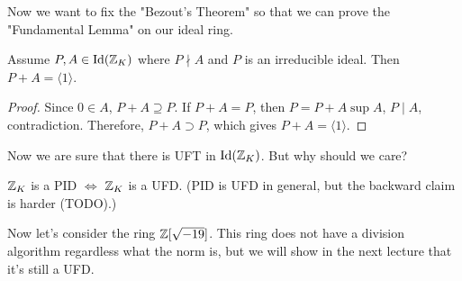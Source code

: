 \documentclass[12pt,twoside=semi,openright,numbers=noenddot]{scrbook}
\begin{document}
Now we want to fix the "Bezout's Theorem" so that we can prove the "Fundamental Lemma" on our ideal ring.
\begin{theorem}
    Assume $P, A \in \text{Id}(\mathbb Z_K)$ where $P \nmid A$ and $P$ is an irreducible ideal. Then $P+A = \langle 1 \rangle$.
\end{theorem}
    \begin{proof}
        Since $0 \in A$, $P+A \supseteq P$. If $P+A = P$, then $P = P+A \sup A$, $P \mid A$, contradiction.
        Therefore, $P+A \supset P$, which gives $P+A = \langle 1 \rangle$.
    \end{proof}

Now we are sure that there is UFT in $\text{Id}(\mathbb Z_K)$. But why should we care?
\begin{remark}
    $\mathbb Z_K$ is a PID $\Leftrightarrow$ $\mathbb Z_K$ is a UFD. (PID is UFD in general, but the backward claim is harder (TODO).)
\end{remark}

Now let's consider the ring $\mathbb Z[\sqrt{-19}]$. This ring does not have a division algorithm regardless what the norm is, but 
we will show in the next lecture that it's still a UFD.
\end{document}
